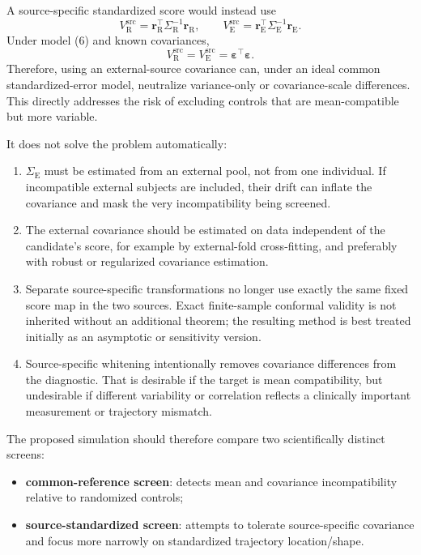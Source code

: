 \documentclass[11pt]{article}
\newcommand{\R}{\mathrm{R}}
\newcommand{\E}{\mathrm{E}}
\begin{document}
A source-specific standardized score would instead use
\[
V_{\R}^{\mathrm{src}}
=\bm r_{\R}^{\top}\Sigma_{\R}^{-1}\bm r_{\R},
\qquad
V_{\E}^{\mathrm{src}}
=\bm r_{\E}^{\top}\Sigma_{\E}^{-1}\bm r_{\E}.
\tag{7}
\]
Under model (6) and known covariances,
\[
V_{\R}^{\mathrm{src}}=V_{\E}^{\mathrm{src}}=\bm\varepsilon^{\top}\bm\varepsilon.
\]
Therefore, using an external-source covariance can, under an ideal common standardized-error model, neutralize variance-only or covariance-scale differences. This directly addresses the risk of excluding controls that are mean-compatible but more variable.

It does not solve the problem automatically:
\begin{enumerate}
    \item $\Sigma_{\E}$ must be estimated from an external pool, not from one individual. If incompatible external subjects are included, their drift can inflate the covariance and mask the very incompatibility being screened.
    \item The external covariance should be estimated on data independent of the candidate's score, for example by external-fold cross-fitting, and preferably with robust or regularized covariance estimation.
    \item Separate source-specific transformations no longer use exactly the same fixed score map in the two sources. Exact finite-sample conformal validity is not inherited without an additional theorem; the resulting method is best treated initially as an asymptotic or sensitivity version.
    \item Source-specific whitening intentionally removes covariance differences from the diagnostic. That is desirable if the target is mean compatibility, but undesirable if different variability or correlation reflects a clinically important measurement or trajectory mismatch.
\end{enumerate}

The proposed simulation should therefore compare two scientifically distinct screens:
\begin{itemize}
    \item \textbf{common-reference screen}: detects mean and covariance incompatibility relative to randomized controls;
    \item \textbf{source-standardized screen}: attempts to tolerate source-specific covariance and focus more narrowly on standardized trajectory location/shape.
\end{itemize}
\end{document}
